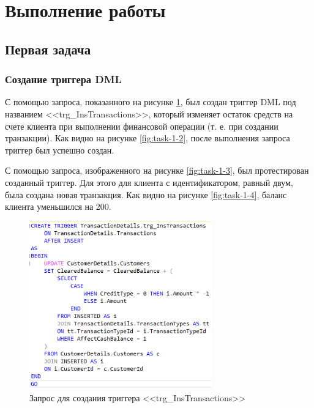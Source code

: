 \documentclass[a4paper, 14pt]{extarticle}
\begin{document}
\section{Выполнение работы}

\subsection{Первая задача}

\subsubsection{Создание триггера DML}

С помощью запроса, показанного на рисунке \ref{fig:task-1-1}, был создан триггер
DML под названием <<\foreignlanguage{english}{trg\_InsTransactions}>>, который
изменяет остаток средств на счете клиента при выполнении финансовой операции (т.
е. при создании транзакции). Как видно на рисунке \ref{fig:task-1-2}, после
выполнения запроса триггер был успешно создан.

С помощью запроса, изображенного на рисунке \ref{fig:task-1-3}, был
протестирован созданный триггер. Для этого для клиента с идентификатором, равный
двум, была создана новая транзакция. Как видно на рисунке \ref{fig:task-1-4},
баланс клиента уменьшился на 200.

\begin{figure}[H]
  \centering
  \includegraphics[width=0.7\textwidth]{images/task-1/1.png}
  \caption{
    Запрос для создания триггера
    <<\foreignlanguage{english}{trg\_InsTransactions}>>
  }
  \label{fig:task-1-1}
\end{figure}
\end{document}
